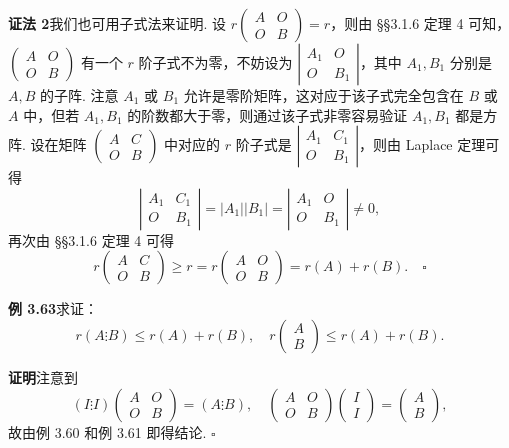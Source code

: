\documentclass[UTF8, 12pt, fontset=fandol, oneside]{ctexart}
\begin{document}
\noindent\textbf{证法 2}\quad 我们也可用子式法来证明. 设 $r\begin{pmatrix}A&O\\O&B\end{pmatrix}=r$，则由 §§3.1.6 定理 4 可知，$\begin{pmatrix}A&O\\O&B\end{pmatrix}$ 有一个 $r$ 阶子式不为零，不妨设为 $\left|\begin{array}{cc}A_1&O\\O&B_1\end{array}\right|$，其中 $A_1,B_1$ 分别是 $A,B$ 的子阵. 注意 $A_1$ 或 $B_1$ 允许是零阶矩阵，这对应于该子式完全包含在 $B$ 或 $A$ 中，但若 $A_1,B_1$ 的阶数都大于零，则通过该子式非零容易验证 $A_1,B_1$ 都是方阵. 设在矩阵 $\begin{pmatrix}A&C\\O&B\end{pmatrix}$ 中对应的 $r$ 阶子式是 $\left|\begin{array}{cc}A_1&C_1\\O&B_1\end{array}\right|$，则由 Laplace 定理可得
\[
\left|\begin{array}{cc}A_1&C_1\\O&B_1\end{array}\right|=|A_1||B_1|=
\left|\begin{array}{cc}A_1&O\\O&B_1\end{array}\right|\ne 0,
\]
再次由 §§3.1.6 定理 4 可得
\[
r\begin{pmatrix}A&C\\O&B\end{pmatrix}\ge r=r\begin{pmatrix}A&O\\O&B\end{pmatrix}=r(A)+r(B). \quad \square
\]

\noindent\textbf{例 3.63}\quad 求证：
\[
r(A\vdots B)\le r(A)+r(B),\quad r\begin{pmatrix}A\\B\end{pmatrix}\le r(A)+r(B).
\]

\noindent\textbf{证明}\quad 注意到
\[
(I\vdots I)\begin{pmatrix}A&O\\O&B\end{pmatrix}=(A\vdots B),\quad
\begin{pmatrix}A&O\\O&B\end{pmatrix}\begin{pmatrix}I\\I\end{pmatrix}=\begin{pmatrix}A\\B\end{pmatrix},
\]
故由例 3.60 和例 3.61 即得结论. $\square$
\end{document}
